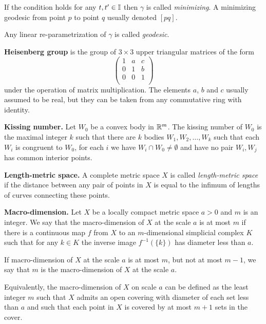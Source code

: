 \begin{description}
If the condition holds for any $t,t'\in\mathbb{I}$ then $\gamma$ is called \emph{minimizing}.
A minimizing geodesic from point $p$ to point $q$ usually denoted $[pq]$.

Any linear re-parametrization of $\gamma$ is called \emph{geodesic}.

\item{\bf Heisenberg group}\label{Heisenberg group}
is the group of $3\times3$ upper triangular matrices of the form
\[\begin{pmatrix}
 1 & a & c\\
 0 & 1 & b\\
 0 & 0 & 1\\
\end{pmatrix}\]
under the operation of matrix multiplication. The elements $a$, $b$ and $c$ usually assumed to be real,
but they can be taken from any commutative ring with identity.

\item{\bf Kissing number.}\label{Kissing number}
Let  $W_0$ be a convex body in $\mathbb{R}^m$.
The kissing number of $W_0$ is the maximal integer $k$ such that there are $k$ bodies $W_1,W_2,\dots,W_k$ such that each $W_i$ is congruent to $W_0$,
for each $i$ we have $W_i\cap W_0\not=\emptyset$ and have no pair $W_i,W_j$ has common interior points.

\item{\bf  Length-metric space.}\label{Length-metric space} 
A complete metric space $X$ is called {\it length-metric space}  if the distance between any pair of points in $X$ is equal to the infimum of lengths of curves connecting these points. 

\item{\bf Macro-dimension.}\label{Macrodimension}
Let $X$ be a locally compact metric space $a>0$ and $m$ is an integer.
We say that the macro-dimension  of $X$ at the scale $a$ is at most $m$
if there is a continuous map $f$ from $X$ to an $m$-dimensional simplicial complex $K$
such that for any $k\in K$ the inverse image $f^{-1}(\{k\})$ has diameter less than $a$.

If macro-dimension of $X$ at the scale $a$ is at most $m$,
but not at most $m-1$, 
we say that $m$ is the macro-dimension of $X$ at the scale $a$.

Equivalently, the macro-dimension of $X$ on scale $a$ can be defined as 
the least integer $m$ such that $X$ admits an open covering with diameter of each set less than $a$ 
and such that each point in $X$ is covered by at most $m+1$ sets in the cover.



\end{description}
